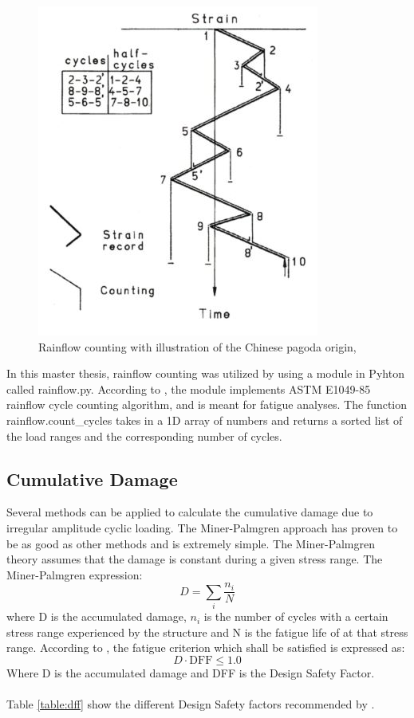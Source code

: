 \begin{figure}[H]
\centering
\includegraphics[scale=0.9]{figures/pagoda}
\caption[$\; \:$Rainflow counting]{Rainflow counting with illustration of the Chinese pagoda origin,   \cite{fatigue2016} }
 \label{fig:pagoda}
\end{figure}
\noindent In this master thesis, rainflow counting was utilized by using a module in Pyhton called rainflow.py. According to \cite{rf}, the module implements ASTM E1049-85 rainflow cycle counting
algorithm, and is meant for fatigue analyses. The function rainflow.count\_cycles takes in a 1D array of numbers and returns a sorted list of the load ranges and the corresponding
number of cycles.

\subsection{Cumulative Damage}
Several methods can be applied to calculate the cumulative damage due to irregular amplitude cyclic loading. The Miner-Palmgren approach has proven to be as good as other methods and is extremely simple. The Miner-Palmgren theory assumes that the damage is constant during a given stress range. The Miner-Palmgren expression:
\begin{equation}
    D=\sum_i \frac{n_i}{N} 
    \label{eq:MP}
\end{equation}
where D is the accumulated damage, $n_i$ is the number of cycles with a certain stress range experienced by the structure and N is the fatigue life of at that stress range.\newline
\newline
According to \cite{riserfat}, the fatigue criterion which shall be satisfied is expressed as:
\begin{equation}
    D \cdot \text{DFF} \leq 1.0
\end{equation}
Where D is the accumulated damage and DFF is the Design Safety Factor.\\\\ Table \ref{table:dff} show the different Design Safety factors recommended by \cite{riserfat}. 

